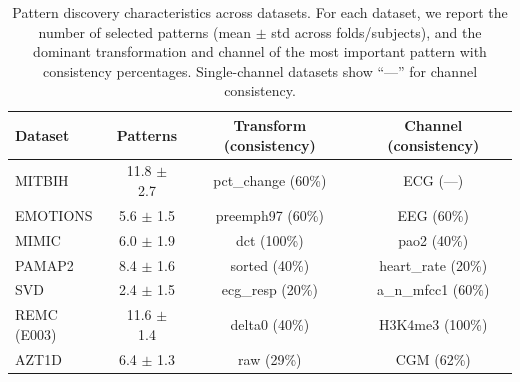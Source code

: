 \begin{table}[H]
\centering
\caption{Pattern discovery characteristics across datasets. For each dataset, we report
the number of selected patterns (mean $\pm$ std across folds/subjects), and the dominant
transformation and channel of the most important pattern with consistency percentages.
Single-channel datasets show ``---'' for channel consistency.}
\label{tab:pattern_stability}
\footnotesize
\begin{tabular*}{\textwidth}{@{\extracolsep{\fill}}lccc@{}}
\toprule
\textbf{Dataset} & \textbf{Patterns} & \textbf{Transform (consistency)} & \textbf{Channel (consistency)} \\
\midrule
MITBIH & 11.8 $\pm$ 2.7 & pct\_change (60\%) & ECG (---) \\
EMOTIONS & 5.6 $\pm$ 1.5 & preemph97 (60\%) & EEG (60\%) \\
MIMIC & 6.0 $\pm$ 1.9 & dct (100\%) & pao2 (40\%) \\
PAMAP2 & 8.4 $\pm$ 1.6 & sorted (40\%) & heart\_rate (20\%) \\
SVD & 2.4 $\pm$ 1.5 & ecg\_resp (20\%) & a\_n\_mfcc1 (60\%) \\
REMC (E003) & 11.6 $\pm$ 1.4 & delta0 (40\%) & H3K4me3 (100\%) \\
AZT1D & 6.4 $\pm$ 1.3 & raw (29\%) & CGM (62\%) \\
\bottomrule
\end{tabular*}
\end{table}